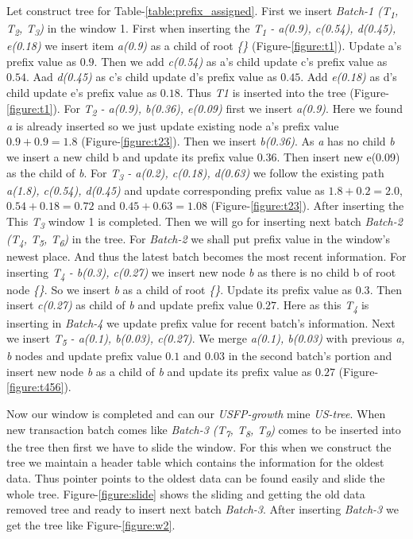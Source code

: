     Let construct tree for Table-\ref{table:prefix_assigned}. First we insert \emph{Batch-1 (T\textsubscript{1}, T\textsubscript{2}, T\textsubscript{3})} in the window 1. First when inserting the \emph{T\textsubscript{1} - a(0.9), c(0.54), d(0.45), e(0.18)} we insert item \emph{a(0.9)} as a child of root \emph{\{\}} (Figure-\ref{figure:t1}). Update a's prefix value as $0.9$. Then we add \emph{c(0.54)} as a's child update c's prefix value as $0.54$. Aad \emph{d(0.45)} as c's child update d's prefix value as $0.45$. Add \emph{e(0.18)} as d's child update e's prefix value as $0.18$. Thus \emph{T1} is inserted into the tree (Figure-\ref{figure:t1}). For \emph{T\textsubscript{2} - a(0.9), b(0.36), e(0.09)} first we insert \emph{a(0.9)}. Here we found \emph{a} is already inserted so we just update existing node a's prefix value $0.9 + 0.9 = 1.8$ (Figure-\ref{figure:t23}). Then we insert \emph{b(0.36)}. As \emph{a} has no child \emph{b} we insert a new child b and update its prefix value $0.36$. Then insert new e(0.09) as the child of \emph{b}. For \emph{T\textsubscript{3} - a(0.2), c(0.18), d(0.63)} we follow the existing path \emph{a(1.8), c(0.54), d(0.45)} and update corresponding prefix value as $1.8 + 0.2 = 2.0$, $0.54 + 0.18 = 0.72$ and $0.45 + 0.63 = 1.08$ (Figure-\ref{figure:t23}). After inserting the This \emph{T\textsubscript{3}} window 1 is completed. Then we will go for inserting next batch \emph{Batch-2 (T\textsubscript{4}, T\textsubscript{5}, T\textsubscript{6})} in the tree. For \emph{Batch-2} we shall put prefix value in the window's newest place. And thus the latest batch becomes the most recent information. For inserting \emph{T\textsubscript{4} - b(0.3), c(0.27)} we insert new node \emph{b} as there is no child b of root node \emph{\{\}}. So we insert \emph{b} as a child of root \emph{\{\}}. Update its prefix value as $0.3$. Then insert \emph{c(0.27)} as child of \emph{b} and update prefix value $0.27$. Here as this \emph{T\textsubscript{4}} is inserting in \emph{Batch-4} we update prefix value for recent batch's information. Next we insert \emph{T\textsubscript{5} - a(0.1), b(0.03), c(0.27)}. We merge \emph{a(0.1), b(0.03)} with previous \emph{a, b } nodes and update prefix value $0.1$ and $0.03$ in the second batch's portion and insert new node \emph{b} as a child of \emph{b} and update its prefix value as $0.27$ (Figure-\ref{figure:t456}).
    
    Now our window is completed and can our \emph{USFP-growth} mine \emph {US-tree}. When new transaction batch comes like \emph{Batch-3 (T\textsubscript{7}, T\textsubscript{8}, T\textsubscript{9})} comes to be inserted into the tree then first we have to slide the window. For this when we construct the tree we maintain a header table which contains the information for the oldest data. Thus pointer points to the oldest data can be found easily and slide the whole tree. Figure-\ref{figure:slide} shows the sliding and getting the old data removed tree and ready to insert next batch \emph{Batch-3}. After inserting \emph{Batch-3} we get the tree like Figure-\ref{figure:w2}. 
